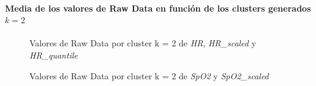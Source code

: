 \paragraph{Media de los valores de Raw Data en función de los clusters generados $k = 2$}

\begin{figure}[H]
    \centering
    \caption{Valores de Raw Data por cluster k = 2 de \textit{HR}, \textit{HR\_scaled} y \textit{HR\_quantile}}\label{fig:raw_data_cls_fc}
\end{figure}

\begin{figure}[ht]
    \centering
    \hfill
    \caption{Valores de Raw Data por cluster k = 2 de \textit{SpO2} y \textit{SpO2\_scaled}}\label{fig:raw_data_cls_spo2}
\end{figure}
